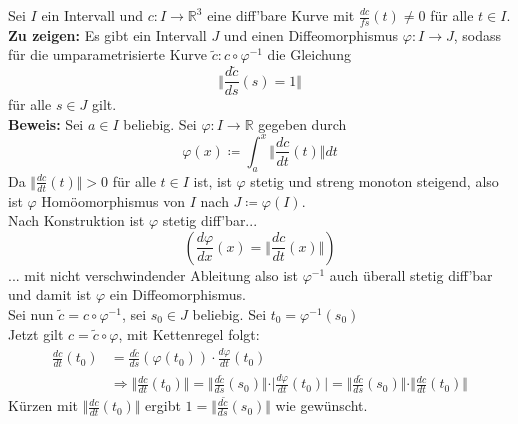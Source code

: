\begin{problem*}[3]
Sei $ I $ ein Intervall und $c: I \to \mathbb{R}^3 $ eine diff'bare Kurve mit $\frac{dc}{fs}(t) \neq 0$ für alle $ t \in I $.\\
\textbf{Zu zeigen:} Es gibt ein Intervall $ J $ und einen Diffeomorphismus $\varphi : I \to J$, sodass für die umparametrisierte Kurve $ \tilde{ c }: c \circ \varphi^{ -1 } $ die Gleichung 
\begin{equation*}
  \Vert \frac{d\tilde{ c }}{ds}(s) = 1 \Vert
\end{equation*}
für alle $ s \in J $ gilt.\\
\textbf{Beweis:} Sei $ a \in I$ beliebig. Sei $ \varphi: I \to \mathbb{R}$ gegeben durch 
\begin{equation*}
  \varphi(x) \coloneqq \int_a^x { \Vert \frac{dc}{dt}(t) \Vert }dt
\end{equation*}
Da $ \Vert \frac{dc}{dt}(t)  \Vert > 0$ für alle $ t \in I $ ist, ist $ \varphi$ stetig und streng monoton steigend, also ist $ \varphi $ Homöomorphismus von $ I $ nach $ J \coloneqq \varphi (I)$.\\
Nach Konstruktion ist $\varphi$ stetig diff'bar...
\begin{equation*}
  \left( \frac{d \varphi}{dx}(x) = \Vert \frac{dc}{dt}(x) \Vert\right)
\end{equation*}
... mit nicht verschwindender Ableitung also ist $\varphi^{ -1 }$ auch überall stetig diff'bar und damit ist $\varphi$ ein Diffeomorphismus.\\
Sei nun $ \tilde{ c } = c \circ \varphi^{ -1 }$, sei $s_0 \in J$ beliebig. Sei $t_0 = \varphi^{ -1 }(s_0)$\\
Jetzt gilt $c = \tilde{ c } \circ \varphi$, mit Kettenregel folgt:
\begin{align*}
\frac{dc}{dt}(t_0) &= \frac{d \tilde{ c }}{ds}(\varphi(t_0))\cdot \frac{d \varphi}{dt}(t_0) \\
&\Rightarrow \Vert \frac{dc}{dt}(t_0)\Vert = \Vert \frac{d \tilde{ c }}{ds}(s_0) \Vert \cdot \vert \frac{d \varphi}{dt}(t_0) \vert = \Vert \frac{d \tilde{ c }}{ds}(s_0) \Vert \cdot \Vert \frac{dc}{dt}(t_0) \Vert
\end{align*}
Kürzen mit $\Vert \frac{dc}{dt} (t_0) \Vert $
ergibt $ 1 = \Vert \frac{d \tilde{ c }}{ds}(s_0) \Vert $ wie gewünscht.\\

\end{problem*}



